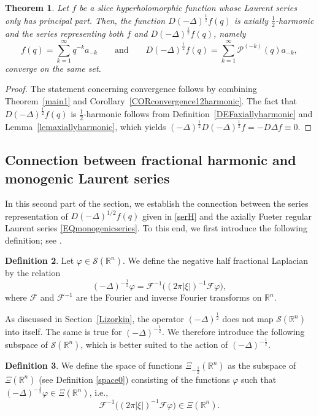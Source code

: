 \documentclass[reqno,11pt]{amsart}
\newtheorem{theorem}{Theorem}[section]
\theoremstyle{definition}
\newtheorem{definition}[theorem]{Definition}
\def\R{\mathbb{R}}
\begin{document}
\begin{theorem}\label{THMah}
	Let $f$ be a slice hyperholomorphic function whose Laurent series only has principal part. Then, the function $D(-\Delta)^\frac{1}{2} f(q) $ is axially $\frac{1}{2}$-harmonic  and the series representing both $f$ and $D(-\Delta)^\frac{1}{2} f(q)$, namely
	\begin{equation}
	\label{serH}
		 f(q) = \sum_{k=1}^\infty q^{-k}a_{-k}\qquad \text{and}\qquad D(-\Delta)^\frac{1}{2} f(q) = \sum_{k=1}^\infty \mathcal{P}^{(-k)}(q)a_{-k},
	\end{equation}
	 converge on the same set.
\end{theorem}
\begin{proof}
	The statement concerning convergence follows by combining Theorem~\ref{main1} and Corollary~\ref{CORconvergence12harmonic}. The fact that $D(-\Delta)^\frac{1}{2} f(q) $ is $\frac{1}{2}$-harmonic follows from Definition~\ref{DEFaxiallyharmonic} and Lemma~\ref{lemaxiallyharmonic}, which yields $(-\Delta)^\frac{1}{2}D(-\Delta)^\frac{1}{2}f = -D\Delta f\equiv 0$.
\end{proof}






\subsection{Connection between fractional harmonic and monogenic Laurent series}


In this second part of the section, we establish the connection between the series representation of $D(-\Delta)^{1/2}f(q)$ given in \eqref{serH} and the axially Fueter regular Laurent series \eqref{EQmonogenicseries}. To this end, we first introduce the following definition; see \cite{SILDUE,Stin}.
\begin{definition}\label{negativelapla} Let $\varphi\in \mathcal{S}(\mathbb{R}^n)$. We define the negative half fractional Laplacian by the relation
	\begin{equation}
		\label{delta1}
		(-\Delta)^{-\frac{1}{2}}\varphi =\mathcal{F}^{-1}\big((2 \pi  |\xi|)^{-1} \mathcal{F}\varphi\big),
	\end{equation}
	where $\mathcal{F}$ and $\mathcal{F}^{-1}$ are the Fourier and inverse Fourier transforms on $\R^{n}$.
\end{definition}
As discussed in Section~\ref{Lizorkin}, the operator $(-\Delta)^{\frac{1}{2}}$ does not map $\mathcal{S}(\mathbb{R}^n)$ into itself. The same is true for $(-\Delta)^{-\frac{1}{2}}$. We therefore introduce the following subspace of $\mathcal{S}(\mathbb{R}^n)$, which is better suited to the action of $(-\Delta)^{-\frac{1}{2}}$.
\begin{definition}
	\label{space1}
We define the space of functions $\Xi_{-\frac{1}{2}}(\R^n)$ as the subspace of $\Xi(\R^n)$ (see Definition \ref{space0}) consisting of the functions $\varphi$ such that $(-\Delta)^{-\frac{1}{2}}\varphi\in \Xi(\R^n)$, i.e.,
\[
\mathcal{F}^{-1}\big( (2\pi|\xi|)^{-1} \mathcal{F}\varphi\big)\in \Xi(\R^n).
\]
\end{definition}
\end{document}
